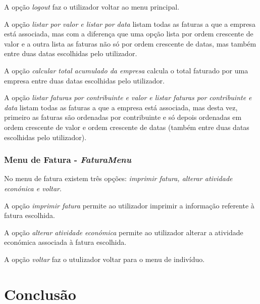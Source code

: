 \documentclass[12pt]{report}
\newcommand\tab[1][0.5cm]{\hspace*{#1}}
\begin{document}
A opção \textit{logout} faz o utilizador voltar ao menu principal.

A opção \textit{listar por valor e listar por data} listam todas as faturas a que a empresa está associada, mas com a diferença que uma opção lista por ordem crescente de valor e a outra lista as faturas não só por ordem crescente de datas, mas também entre duas datas escolhidas pelo utilizador.

A opção \textit{calcular total acumulado da empresa} calcula o total faturado por uma empresa entre duas datas escolhidas pelo utilizador.

A opção \textit{listar faturas por contribuinte e valor e listar faturas por contribuinte e data} listam todas as faturas a que a empresa está associada, mas desta vez, primeiro as faturas são ordenadas por contribuinte e só depois ordenadas em ordem crescente de valor e ordem crescente de datas (também entre duas datas escolhidas pelo utilizador).
\subsection{Menu de Fatura - \textit{FaturaMenu}}
\tab No menu de fatura existem três opções: \textit{imprimir fatura, alterar atividade econónica e voltar}.

A opção \textit{imprimir fatura} permite ao utilizador imprimir a informação referente à fatura escolhida.

A opção \textit{alterar atividade económica} permite ao utilizador alterar a atividade económica associada à fatura escolhida.

A opção \textit{voltar} faz o utulizador voltar para o menu de indivíduo.

\chapter{Conclusão}
\label{sec:resumo}
\end{document}
